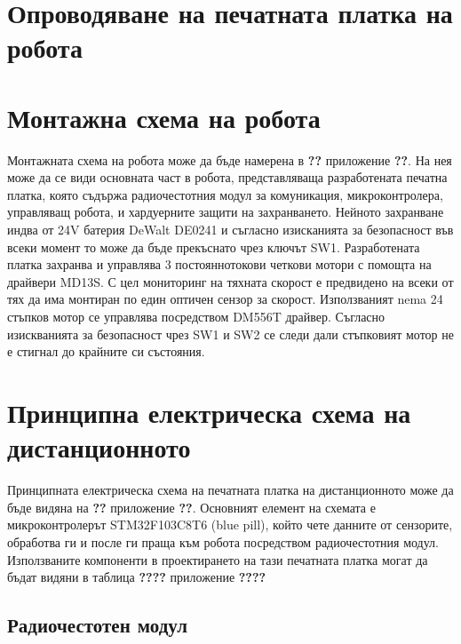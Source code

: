 \section{Опроводяване на печатната платка на робота}


\section{Монтажна схема на робота}

Монтажната схема на робота може да бъде намерена в \textbf{??} приложение \textbf{??}. На нея може да се види основната част в робота, представляваща разработената печатна платка, която съдържа радиочестотния модул за комуникация, микроконтролера, управляващ робота, и хардуерните защити на захранването. Нейното захранване индва от 24V батерия DeWalt DE0241 и съгласно изисканията за безопасност във всеки момент то може да бъде прекъснато чрез ключът SW1. Разработената платка захранва и управлява 3 постояннотокови четкови мотори с помощта на драйвери MD13S. С цел мониторинг на тяхната скорост е предвидено на всеки от тях да има монтиран по един оптичен сензор за скорост. Използваният nema 24 стъпков мотор се управлява посредством DM556T драйвер. Съгласно изискванията за безопасност чрез SW1 и SW2 се следи дали стъпковият мотор не е стигнал до крайните си състояния.




\section{Принципна електрическа схема на дистанционното}

Принципната електрическа схема на печатната платка на дистанционното може да бъде видяна на \textbf{??} приложение \textbf{??}. Основният елемент на схемата е микроконтролерът STM32F103C8T6 (blue pill), който чете данните от сензорите, обработва ги и после ги праща към робота посредством радиочестотния модул. Използваните компоненти в проектирането на тази печатната платка могат да бъдат видяни в таблица \textbf{????} приложение \textbf{????}



\subsection{Радиочестотен модул}

